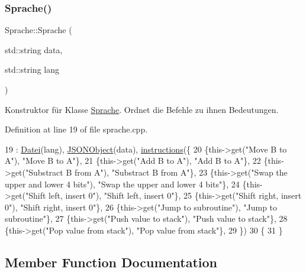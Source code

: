\subsubsection{\texorpdfstring{Sprache()}{Sprache()}}
{\footnotesize\ttfamily Sprache\+::\+Sprache (\begin{DoxyParamCaption}\item[{std\+::string}]{data,  }\item[{std\+::string}]{lang }\end{DoxyParamCaption})}

Konstruktor für Klasse \mbox{\hyperlink{class_sprache}{Sprache}}. Ordnet die Befehle zu ihnen Bedeutungen. 

Definition at line 19 of file sprache.\+cpp.


\begin{DoxyCode}
19                                                : \mbox{\hyperlink{class_datei_a9a9e1149154603548fdfc889821cf418}{Datei}}(lang), \mbox{\hyperlink{class_j_s_o_n_object_a88fb28a2f166ecc545ae94f170ddd0ab}{JSONObject}}(data), 
      \mbox{\hyperlink{class_sprache_a6052a9ec0d1202da4b8ff6e6a52e6244}{instructions}}(\{
20     \{this->\textcolor{keyword}{get}(\textcolor{stringliteral}{"Move B to A"}), \textcolor{stringliteral}{"Move B to A"}\},
21     \{this->\textcolor{keyword}{get}(\textcolor{stringliteral}{"Add B to A"}), \textcolor{stringliteral}{"Add B to A"}\},
22     \{this->\textcolor{keyword}{get}(\textcolor{stringliteral}{"Substract B from A"}), \textcolor{stringliteral}{"Substract B from A"}\},
23     \{this->\textcolor{keyword}{get}(\textcolor{stringliteral}{"Swap the upper and lower 4 bits"}), \textcolor{stringliteral}{"Swap the upper and lower 4 bits"}\},
24     \{this->\textcolor{keyword}{get}(\textcolor{stringliteral}{"Shift left, insert 0"}), \textcolor{stringliteral}{"Shift left, insert 0"}\},
25     \{this->\textcolor{keyword}{get}(\textcolor{stringliteral}{"Shift right, insert 0"}), \textcolor{stringliteral}{"Shift right, insert 0"}\},
26     \{this->\textcolor{keyword}{get}(\textcolor{stringliteral}{"Jump to subroutine"}), \textcolor{stringliteral}{"Jump to subroutine"}\},
27     \{this->\textcolor{keyword}{get}(\textcolor{stringliteral}{"Push value to stack"}), \textcolor{stringliteral}{"Push value to stack"}\},
28     \{this->\textcolor{keyword}{get}(\textcolor{stringliteral}{"Pop value from stack"}), \textcolor{stringliteral}{"Pop value from stack"}\},
29     \})
30 \{ 
31 \}
\end{DoxyCode}


\subsection{Member Function Documentation}
\mbox{\label{class_sprache_a1e1e39e91e6d33e068fed01333fa99cc}} 
